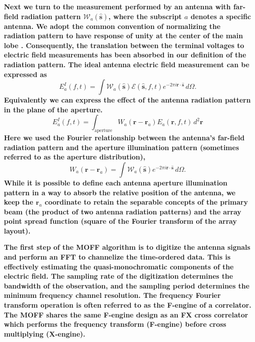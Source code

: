 \documentclass[a4paper,fleqn,usenatbib]{../mnras}
\begin{document}
\textbf{Next we turn to the measurement performed by an antenna with far-field radiation pattern 
$\mathcal{W}_a(\hat{\mathbf{s}})$, where the subscript $a$ denotes a specific antenna. We 
adopt the common convention of normalizing the radiation pattern to have response of unity at the 
center of the main lobe \citep[e.g.][]{nap99}. Consequently, the translation between the terminal 
voltages to electric field measurements has been absorbed in our definition of the radiation 
pattern. The ideal antenna electric field measurement can be expressed as 
\begin{equation}
E^I_a(f,t) = \int \mathcal{W}_a(\hat{\mathbf{s}})\mathcal{E}(\hat{\mathbf{s}},f,t) e^{-2\pi i \mathbf{r} \cdot \hat{\mathbf{s}}}\, d\Omega. 
\end{equation}
Equivalently we can express the effect of the antenna radiation pattern in the plane of the 
aperture.
\begin{equation}
E^I_a(f,t) = \int_{\mathrm{aperture}}W_a(\mathbf{r}-\mathbf{r}_a)E_a(\mathbf{r},f,t)\,d^2\mathbf{r}
\end{equation}
Here we used the Fourier relationship between the antenna's far-field radiation pattern and the 
aperture illumination pattern (sometimes referred to as the aperture distribution), 
\begin{equation}
W_a(\mathbf{r}-\mathbf{r}_a)=\int  \mathcal{W}_a(\hat{\mathbf{s}}) e^{-2\pi i \mathbf{r} \cdot \hat{\mathbf{s}}}\, d
\Omega.
\end{equation} 
While it is possible to define each antenna aperture illumination pattern in a way to absorb the 
relative position of the antenna, we keep the $\mathbf{r}_a$ coordinate to retain the separable
concepts of the primary beam (the product of two antenna radiation patterns) and the array
point spread function (square of the Fourier transform of the array layout).}

\textbf{The first step of the MOFF algorithm is to digitize the antenna signals and perform an FFT to 
channelize the time-ordered data. This is effectively estimating the quasi-monochromatic 
components of the electric field. The sampling rate of the digitization 
determines the bandwidth of the observation, and the sampling period determines the minimum 
frequency channel resolution. The frequency Fourier transform operation is often referred to as 
the F-engine of a correlator. The MOFF shares the same F-engine design as an FX cross
correlator which performs the frequency transform (F-engine) before cross multiplying 
(X-engine). }
\end{document}
